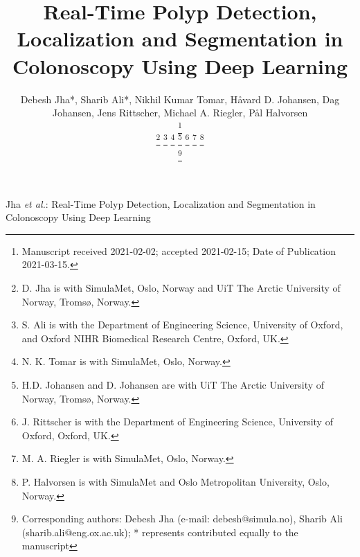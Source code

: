 \documentclass[journal]{IEEEtran}
\begin{document}
\title{Real-Time Polyp Detection, Localization and Segmentation in Colonoscopy Using Deep Learning} 


\author{Debesh Jha*,
Sharib Ali*,
Nikhil Kumar Tomar,
H{\aa}vard D. Johansen,
Dag Johansen,
Jens Rittscher,
Michael A. Riegler,
P{\aa}l Halvorsen

\thanks{Manuscript received 2021-02-02; accepted 2021-02-15; Date of Publication 2021-03-15.} 


\thanks{D. Jha is with SimulaMet, Oslo, Norway and UiT The Arctic University of Norway, Troms{\o}, Norway.}
\thanks{S. Ali is with the Department of Engineering Science, University of Oxford, and Oxford NIHR Biomedical Research Centre, Oxford, UK.}
\thanks{N. K. Tomar is with SimulaMet, Oslo, Norway.}
\thanks{H.D. Johansen and D. Johansen are with UiT The Arctic University of Norway, Troms{\o}, Norway.}
\thanks{J. Rittscher is with the Department of Engineering Science, University of Oxford, Oxford, UK.}
\thanks{M. A. Riegler is with SimulaMet, Oslo, Norway.}
\thanks{P. Halvorsen is with SimulaMet and Oslo Metropolitan University, Oslo, Norway.}

\thanks{Corresponding authors: Debesh Jha (e-mail: debesh@simula.no), Sharib Ali (sharib.ali@eng.ox.ac.uk); * represents contributed equally to the manuscript}

}

{Jha \MakeLowercase{\textit{et al.}}: Real-Time Polyp Detection, Localization and Segmentation in Colonoscopy Using Deep Learning}

\maketitle
\end{document}
